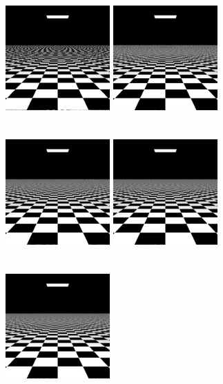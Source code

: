 \documentclass[acmtog]{acmart}
\begin{document}
\begin{figure}[h]
	\centering
	\includegraphics[width=4cm,height=5cm]{gird-simple}
	\includegraphics[width=4cm,height=5cm]{grid-multisample}
	\includegraphics[width=4cm,height=5cm]{clockwise_rotation26.6}
	\includegraphics[width=4cm,height=5cm]{counter_clockwise_rotation26.6}
	\includegraphics[width=4cm,height=5cm]{random_sample}

\end{figure}
\end{document}
